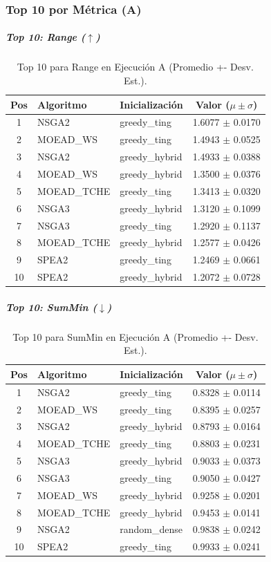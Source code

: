 \documentclass[a4paper,10pt]{article}
\begin{document}
\subsubsection{Top 10 por Métrica (A)}
\subparagraph{Top 10: Range ($\uparrow$)}
\begin{table}[H]
    \centering
    \begin{tabular}{cllc}
        \toprule
        Pos & Algoritmo & Inicialización & Valor ($\mu \pm \sigma$) \\
        \midrule
        1 & NSGA2 & greedy\_ting & 1.6077 $\pm$ 0.0170 \\
        2 & MOEAD\_WS & greedy\_ting & 1.4943 $\pm$ 0.0525 \\
        3 & NSGA2 & greedy\_hybrid & 1.4933 $\pm$ 0.0388 \\
        4 & MOEAD\_WS & greedy\_hybrid & 1.3500 $\pm$ 0.0376 \\
        5 & MOEAD\_TCHE & greedy\_ting & 1.3413 $\pm$ 0.0320 \\
        6 & NSGA3 & greedy\_hybrid & 1.3120 $\pm$ 0.1099 \\
        7 & NSGA3 & greedy\_ting & 1.2920 $\pm$ 0.1137 \\
        8 & MOEAD\_TCHE & greedy\_hybrid & 1.2577 $\pm$ 0.0426 \\
        9 & SPEA2 & greedy\_ting & 1.2469 $\pm$ 0.0661 \\
        10 & SPEA2 & greedy\_hybrid & 1.2072 $\pm$ 0.0728 \\
        \bottomrule
    \end{tabular}
    \caption{Top 10 para Range en Ejecución A (Promedio +- Desv. Est.).}
\end{table}

\subparagraph{Top 10: SumMin ($\downarrow$)}
\begin{table}[H]
    \centering
    \begin{tabular}{cllc}
        \toprule
        Pos & Algoritmo & Inicialización & Valor ($\mu \pm \sigma$) \\
        \midrule
        1 & NSGA2 & greedy\_ting & 0.8328 $\pm$ 0.0114 \\
        2 & MOEAD\_WS & greedy\_ting & 0.8395 $\pm$ 0.0257 \\
        3 & NSGA2 & greedy\_hybrid & 0.8793 $\pm$ 0.0164 \\
        4 & MOEAD\_TCHE & greedy\_ting & 0.8803 $\pm$ 0.0231 \\
        5 & NSGA3 & greedy\_hybrid & 0.9033 $\pm$ 0.0373 \\
        6 & NSGA3 & greedy\_ting & 0.9050 $\pm$ 0.0427 \\
        7 & MOEAD\_WS & greedy\_hybrid & 0.9258 $\pm$ 0.0201 \\
        8 & MOEAD\_TCHE & greedy\_hybrid & 0.9453 $\pm$ 0.0141 \\
        9 & NSGA2 & random\_dense & 0.9838 $\pm$ 0.0242 \\
        10 & SPEA2 & greedy\_ting & 0.9933 $\pm$ 0.0241 \\
        \bottomrule
    \end{tabular}
    \caption{Top 10 para SumMin en Ejecución A (Promedio +- Desv. Est.).}
\end{table}
\end{document}
